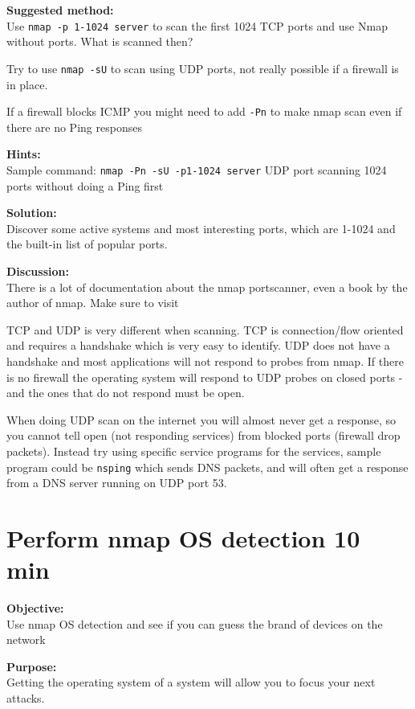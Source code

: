 \documentclass[a4paper,11pt,notitlepage]{report}
\begin{document}
{\bf Suggested method:}\\
Use \verb+nmap -p 1-1024 server+ to scan the first 1024 TCP
ports and use Nmap without ports. What is scanned then?

Try to use \verb+nmap -sU+ to scan using UDP ports, not really possible if a firewall is in place.

If a firewall blocks ICMP you might need to add \verb+-Pn+ to make nmap scan even if there are no Ping responses

{\bf Hints:} \\
Sample command: \verb+nmap -Pn -sU -p1-1024 server+ UDP port scanning
1024 ports without doing a Ping first

{\bf Solution:}\\
Discover some active systems and most interesting ports, which are 1-1024 and the built-in list of popular ports.

{\bf Discussion:}\\
There is a lot of documentation about the nmap portscanner, even a book by the author
of nmap. Make sure to visit 

TCP and UDP is very different when scanning. TCP is connection/flow oriented and requires a handshake which is very easy to identify. UDP does not have a handshake and most applications will not respond to probes from nmap. If there is no firewall the operating system will respond to UDP probes on closed ports - and the ones that do not respond must be open.

When doing UDP scan on the internet you will almost never get a response, so you cannot tell open (not responding services) from blocked ports (firewall drop packets). Instead try using specific service programs for the services, sample program could be \verb+nsping+ which sends DNS packets, and will often get a response from a DNS server running on UDP port 53.

\chapter{Perform nmap OS detection 10 min}
\label{ex:nmap-os}

{\bf Objective:} \\
Use nmap OS detection and see if you can guess the brand of devices on the network

{\bf Purpose:}\\
Getting the operating system of a system will allow you to focus your next attacks.
\end{document}

